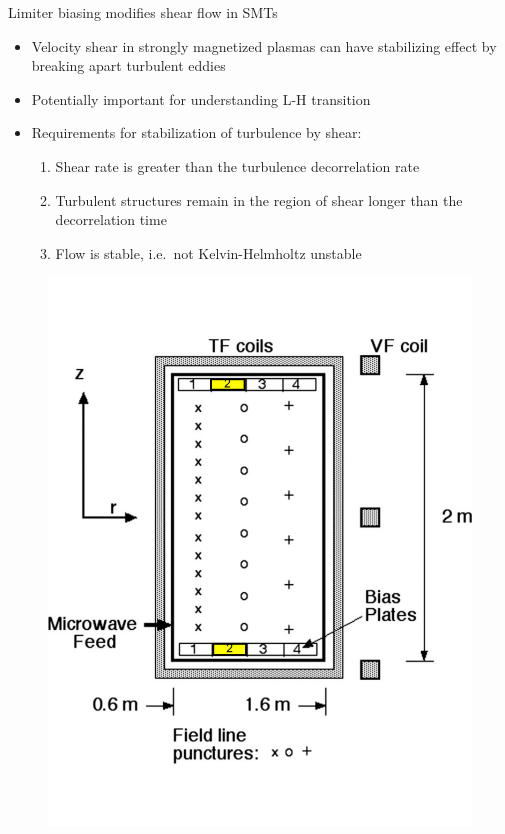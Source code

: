 \documentclass[12pt,table]{beamer}
\begin{document}
\begin{frame}{Limiter biasing modifies shear flow in SMTs}
\begin{minipage}{.45\linewidth}
    \begin{itemize}\footnotesize
        \item Velocity shear in strongly magnetized plasmas can have stabilizing effect by breaking apart turbulent eddies
        \item Potentially important for understanding L-H transition
        \item Requirements for stabilization of turbulence by shear:
        \begin{enumerate}\scriptsize
            \item Shear rate is greater than the turbulence decorrelation rate
            \item Turbulent structures remain in the region of shear longer than the decorrelation time
            \item Flow is stable, i.e.~not Kelvin-Helmholtz unstable
        \end{enumerate}
    \end{itemize}
\end{minipage}%
\hfill
\begin{minipage}{.5\linewidth}
\begin{figure}
    \centering
    \includegraphics[width=.7\linewidth]{figs/figure1.pdf}
    \label{fig:my_label}
\end{figure}

\end{minipage}
\end{frame}
\end{document}
